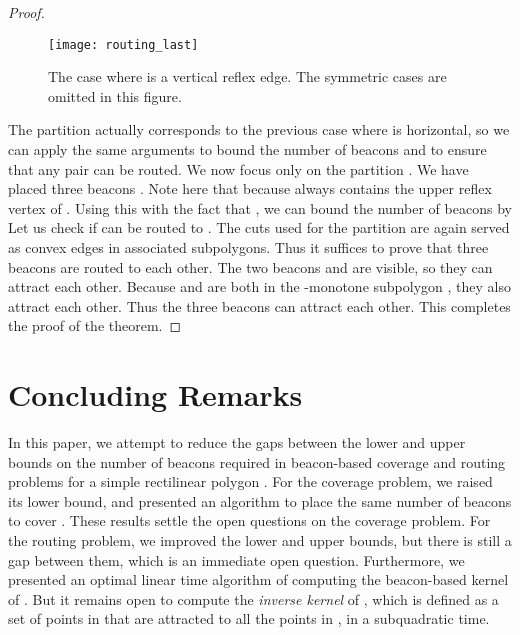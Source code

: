 \documentclass[11pt]{article}
\theoremstyle{definition}
\begin{document}
\begin{proof}
\begin{figure}[tb]
\centering
\texttt{[image: routing\_last]}
\caption{The case where  is a vertical reflex edge. The symmetric cases are omitted in this figure.}
\label{fig:routing_last}
\end{figure}

The partition  actually corresponds to the previous case where  is horizontal, so we can apply the same arguments to bound the number of beacons and to ensure that any pair  can be routed. We now focus only on the partition . We have placed three beacons . Note here that  because  always contains the upper reflex vertex of . Using this with the fact that , we can bound the number of beacons by
 Let us check if  can be routed to . The cuts used for the partition are again served as convex edges in associated subpolygons. Thus it suffices to prove that three beacons  are routed to each other. The two beacons  and  are visible, so they can attract each other. Because  and  are both in the -monotone subpolygon , they also attract each other. Thus the three beacons can attract each other. This completes the proof of the theorem.
\end{proof}




\section{Concluding Remarks} \label{sec:conclusion}


In this paper, we attempt to reduce the gaps between the lower and upper bounds on the number of beacons required in beacon-based coverage and routing problems for a simple rectilinear polygon . For the coverage problem, we raised its lower bound, and presented an algorithm to place the same number of beacons to cover . These results settle the open questions on the coverage problem. For the routing problem, we improved the lower and upper bounds, but there is still a gap between them, which is an immediate open question. Furthermore, we presented an optimal linear time algorithm of computing the beacon-based kernel of . But it remains open to compute the \emph{inverse kernel} of , which is defined as a set of points in  that are attracted to all the points in , in a subquadratic time.
\end{document}
